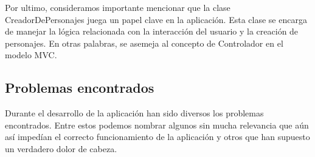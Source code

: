 \documentclass{article}
\begin{document}
Por ultimo, consideramos importante mencionar que la clase CreadorDePersonajes juega un papel clave en la aplicación. Esta clase se encarga de manejar la lógica relacionada con la interacción del usuario y la creación de personajes. En otras palabras, se asemeja al concepto de Controlador en el modelo MVC. 

\subsection{Problemas encontrados}

Durante el desarrollo de la aplicación han sido diversos los problemas encontrados. Entre estos podemos nombrar algunos sin mucha relevancia que aún así impedían el correcto funcionamiento de la aplicación y otros que han supuesto un verdadero dolor de cabeza.
\end{document}
